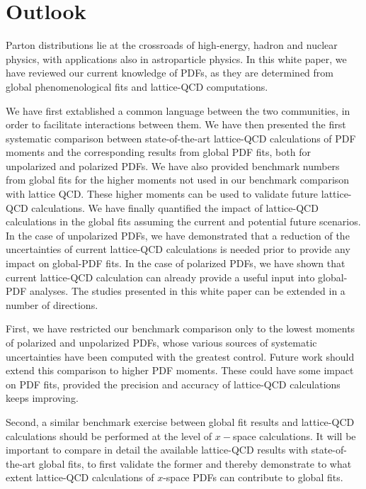 \section{Outlook}
\label{sec:outlook}

Parton distributions lie at the crossroads of high-energy, 
hadron and nuclear physics, with applications also in astroparticle physics.
%
In this white paper, we have reviewed our current knowledge of PDFs, as they
are determined from global phenomenological fits and lattice-QCD computations. 

We have first extablished a common language
between the two communities, in order to facilitate interactions between them.
%
We have then presented the first systematic comparison between state-of-the-art 
lattice-QCD calculations of PDF moments and the corresponding results from 
global PDF fits, both for unpolarized and polarized PDFs.
%
We have also provided benchmark numbers from global fits for the higher moments 
not used in our benchmark comparison with lattice QCD. 
%
These higher moments can be used to validate future lattice-QCD calculations.
%
We have finally quantified the impact of lattice-QCD calculations in the 
global fits assuming the current and potential future scenarios.
%
In the case of unpolarized PDFs, we have demonstrated that a reduction 
of the uncertainties of current lattice-QCD calculations is needed 
prior to provide any impact on global-PDF fits.
%
In the case of polarized PDFs, we have shown that current lattice-QCD
calculation can already provide a useful input into global-PDF analyses.
%
The studies presented in this white paper can be extended in a number of 
directions.

First, we have restricted our benchmark comparison only to the lowest moments 
of polarized and unpolarized PDFs, whose various sources of systematic 
uncertainties have been computed with the greatest control.
%
Future work should extend this comparison to higher PDF moments.
%
These could have some impact on PDF fits, provided the precision and accuracy
of lattice-QCD calculations keeps improving.

Second, a similar benchmark exercise between global fit results and 
lattice-QCD calculations should be performed at the level of
$x-$space calculations.
%
It will be important to compare in detail the available lattice-QCD results 
with state-of-the-art global fits, to first validate the former and
thereby demonstrate to what extent lattice-QCD calculations of $x$-space PDFs 
can contribute to global fits.


